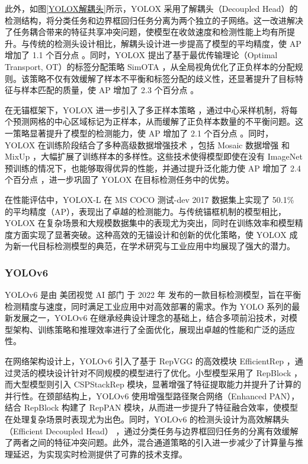 \documentclass[11pt,twocolumn]{ctexart}
\begin{document}
此外，如图\ref{YOLOX解耦头}所示，YOLOX 采用了解耦头（Decoupled Head）的检测结构，将分类任务和边界框回归任务分离为两个独立的子网络。这一改进解决了任务耦合带来的特征共享冲突问题，使模型在收敛速度和检测性能上均有所提升。与传统的检测头设计相比，解耦头设计进一步提高了模型的平均精度，使 AP 增加了 1.1 个百分点 。同时，YOLOX 提出了基于最优传输理论（Optimal Transport, OT）的标签分配策略 SimOTA ，从全局视角优化了正负样本的分配规则。该策略不仅有效缓解了样本不平衡和标签分配的歧义性，还显著提升了目标特征与样本匹配的质量，使 AP 增加了 2.3 个百分点 。

在无锚框架下，YOLOX 进一步引入了多正样本策略 ，通过中心采样机制，将每个预测网格的中心区域标记为正样本，从而缓解了正负样本数量的不平衡问题。这一策略显著提升了模型的检测能力，使 AP 增加了 2.1 个百分点 。同时，YOLOX 在训练阶段结合了多种高级数据增强技术 ，包括 Mosaic 数据增强 和 MixUp ，大幅扩展了训练样本的多样性。这些技术使得模型即使在没有 ImageNet 预训练的情况下，也能够取得优异的性能，并通过提升泛化能力使 AP 增加了 2.4 个百分点 ，进一步巩固了 YOLOX 在目标检测任务中的优势。

在性能评估中，YOLOX-L 在 MS COCO 测试-dev 2017 数据集上实现了 50.1\% 的平均精度（AP），表现出了卓越的检测能力。与传统锚框机制的模型相比，YOLOX 在复杂场景和大规模数据集中的表现尤为突出，同时在训练效率和模型精度方面实现了显著突破。这种高效的无锚设计和创新的优化策略，使 YOLOX 成为新一代目标检测模型的典范，在学术研究与工业应用中均展现了强大的潜力。
\subsubsection{YOLOv6}
YOLOv6\cite{li2022yolov6} 是由 美团视觉 AI 部门 于 2022 年 发布的一款目标检测模型，旨在平衡检测精度与速度，同时满足工业应用中对高效部署的需求。作为 YOLO 系列的最新发展之一，YOLOv6 在继承经典设计理念的基础上，结合多项前沿技术，对模型架构、训练策略和推理效率进行了全面优化，展现出卓越的性能和广泛的适应性。

在网络架构设计上，YOLOv6 引入了基于 RepVGG\cite{ding2021repvgg} 的高效模块 EfficientRep ，通过灵活的模块设计针对不同规模的模型进行了优化。小型模型采用了 RepBlock ，而大型模型则引入 CSPStackRep 模块，显著增强了特征提取能力并提升了计算的并行性。在颈部结构上，YOLOv6 使用增强型路径聚合网络（Enhanced PAN），结合 RepBlock 构建了 RepPAN 模块，从而进一步提升了特征融合效率，使模型在处理复杂场景时表现尤为出色。同时，YOLOv6 的检测头设计为高效解耦头（Efficient Decoupled Head） ，通过分类任务与边界框回归任务的分离有效缓解了两者之间的特征冲突问题。此外，混合通道策略的引入进一步减少了计算量与推理延迟，为实现实时检测提供了可靠的技术支撑。
\end{document}
